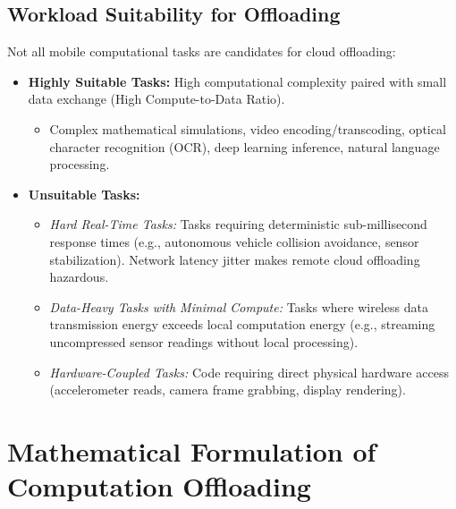 \subsection{Workload Suitability for Offloading}
Not all mobile computational tasks are candidates for cloud offloading:
\begin{itemize}[leftmargin=*]
  \item \textbf{Highly Suitable Tasks:} High computational complexity paired with small data exchange (High Compute-to-Data Ratio).
    \begin{itemize}
      \item Complex mathematical simulations, video encoding/transcoding, optical character recognition (OCR), deep learning inference, natural language processing.
    \end{itemize}
  \item \textbf{Unsuitable Tasks:}
    \begin{itemize}
      \item \emph{Hard Real-Time Tasks:} Tasks requiring deterministic sub-millisecond response times (e.g., autonomous vehicle collision avoidance, sensor stabilization). Network latency jitter makes remote cloud offloading hazardous.
      \item \emph{Data-Heavy Tasks with Minimal Compute:} Tasks where wireless data transmission energy exceeds local computation energy (e.g., streaming uncompressed sensor readings without local processing).
      \item \emph{Hardware-Coupled Tasks:} Code requiring direct physical hardware access (accelerometer reads, camera frame grabbing, display rendering).
    \end{itemize}
\end{itemize}

\section{Mathematical Formulation of Computation Offloading}
